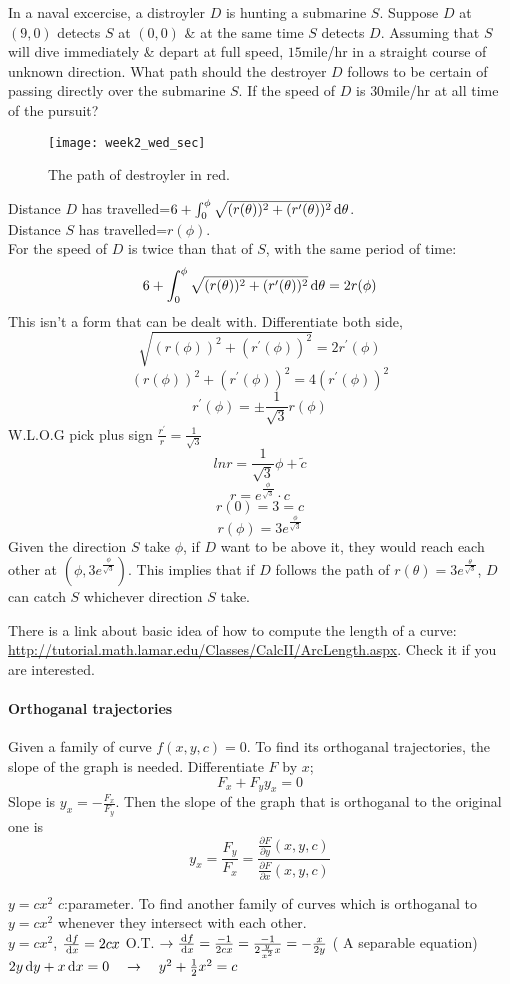 \begin{example}
In a naval excercise, a distroyler $D$ is hunting a submarine $S$. Suppose $D$ at $(9,0)$ detects $S$ at $(0,0)$ \& at the same time $S$ detects $D$. Assuming that $S$ will dive immediately \& depart at full speed, $15$mile/hr in a straight course of unknown direction. What path should the destroyer $D$ follows to be certain of passing directly over the submarine $S$. If the speed of $D$ is $30$mile/hr at all time of the pursuit?
\begin{figure}[H]
\centering
\texttt{[image: week2\_wed\_sec]}
\caption{The path of destroyler in red.}
\end{figure}
Distance $D$ has travelled=$6+\int_0^\phi\sqrt{(r(\theta))^2+(r^\prime(\theta))^2}\,\mathrm{d}\theta$.\\
Distance $S$ has travelled=$r(\phi)$.\\
For the speed of $D$ is twice than that of $S$, with the same period of time:
\[6+\int_0^\phi\sqrt{(r(\theta))^2+(r^\prime(\theta))^2}\,\mathrm{d}\theta=2r(\phi)
\]
This isn't a form that can be dealt with. Differentiate both side,
\[\sqrt{(r(\phi))^2+(r^\prime(\phi))^2}=2r^\prime(\phi)
\]
\[(r(\phi))^2+(r^\prime(\phi))^2=4(r^\prime(\phi))^2
\]
\[r^\prime(\phi)=\pm\frac{1}{\sqrt{3}}r(\phi)
\]
W.L.O.G pick plus sign $\frac{r^\prime}{r}=\frac{1}{\sqrt{3}}$
\[lnr=\frac{1}{\sqrt{3}}\phi+\tilde{c}
\]
\[r=e^{\frac{\phi}{\sqrt{3}}}\cdotp c
\]
\[r(0)=3=c
\]
\[r(\phi)=3e^{\frac{\phi}{\sqrt{3}}}
\]
Given the direction $S$ take $\phi$, if $D$ want to be above it, they would reach each other at $(\phi,3e^{\frac{\phi}{\sqrt{3}}})$. This implies that if $D$ follows the path of 
$r(\theta)=3e^{\frac{\theta}{\sqrt{3}}}$, $D$ can catch $S$ whichever direction $S$ take.
\end{example}
\begin{remark}
There is a link about basic idea of how to compute the length of a curve:
\href{http://tutorial.math.lamar.edu/Classes/CalcII/ArcLength.aspx}{http://tutorial.math.lamar.edu/Classes/CalcII/ArcLength.aspx}. Check it if you are interested.
\end{remark}
\paragraph{Orthoganal trajectories} Given a family of curve $f(x,y,c)=0$. To find its orthoganal trajectories, the slope of the graph is needed. Differentiate $F$ by $x$;
\[F_x+F_yy_x=0
\]
Slope is $y_x=-\frac{F_x}{F_y}$. Then the slope of the graph that is orthoganal to the original one is \[y_x=\frac{F_y}{F_x}=\frac{\frac{\partial F}{\partial y}(x,y,c)}{\frac{\partial F}{\partial x}(x,y,c)}\]
\begin{example}
$y=cx^2$ $c$:parameter. To find another family of curves which is orthoganal to $y=cx^2$ whenever they intersect with each other.\\
$y=cx^2$, $\frac{\,\mathrm{d} f}{\,\mathrm{d} x}=2cx$ O.T. $\rightarrow \frac{\,\mathrm{d} f}{\,\mathrm{d} x}=\frac{-1}{2cx}=\frac{-1}{2\frac{y}{x^2}x}=-\frac{x}{2y}$ ( A separable equation)\\
$2y\,\mathrm{d} y+x\,\mathrm{d} x=0\quad\rightarrow\quad y^2+\frac{1}{2}x^2=c$
\end{example}


